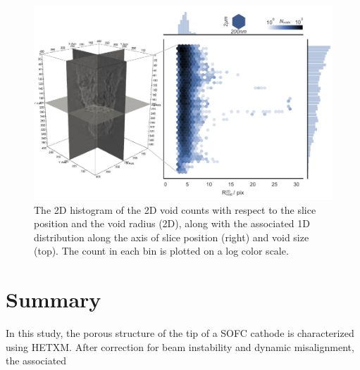\documentclass[12pt]{scrartcl}
\newcommand{\myscale}{1}
\begin{document}
\renewcommand{\myscale}{1.0}
\begin{figure}[htp]
\centering
\includegraphics[scale=\myscale]{void_profile}
\caption{
The 2D histogram of the 2D void counts with respect to the slice position and the void radius (2D), along with the associated 1D distribution along the axis of slice position (right) and void size (top). 
The count in each bin is plotted on a log color scale.
}\label{fig: void profile}
\end{figure}


\section{Summary}\label{sec: summary}

In this study, the porous structure of the tip of a SOFC cathode is characterized using HETXM.
After correction for beam instability and dynamic misalignment, the associated 



\end{document}
